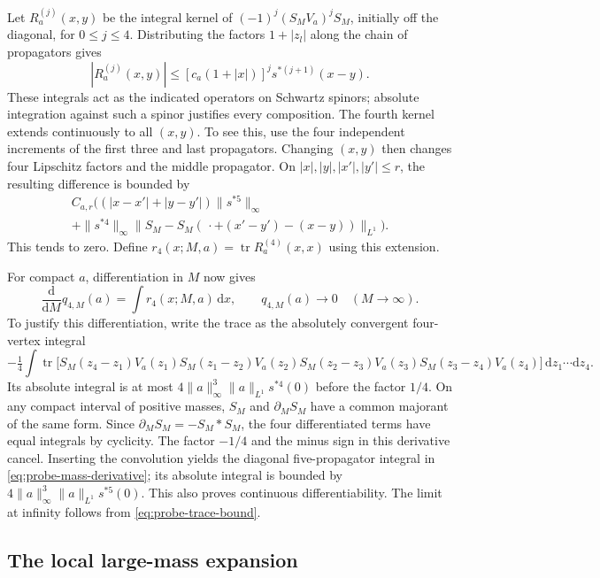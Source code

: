 \documentclass[11pt,letterpaper,reqno]{amsart}
\newcommand{\dd}{\mathrm d}
\DeclareMathOperator{\tr}{tr}
\begin{document}
Let $R_a^{(j)}(x,y)$ be the integral kernel of
$(-1)^j(S_MV_a)^jS_M$, initially off the diagonal, for $0\le j\le4$.
Distributing the factors $1+|z_l|$ along the chain of propagators gives
\begin{equation}\label{eq:probe-kernel-majorant}
 |R_a^{(j)}(x,y)|\le[c_a(1+|x|)]^j s^{*(j+1)}(x-y).
\end{equation}
These integrals act as the indicated operators on Schwartz spinors;
absolute integration against such a spinor justifies every composition.
The fourth kernel extends continuously to all $(x,y)$. To see this,
use the four independent increments of the first three and last
propagators. Changing $(x,y)$ then changes four Lipschitz factors and
the middle propagator. On $|x|,|y|,|x'|,|y'|\le r$, the resulting
difference is bounded by
\begin{multline}\label{eq:probe-kernel-continuity}
 C_{a,r}\bigl((|x-x'|+|y-y'|)\|s^{*5}\|_\infty\\
 +\|s^{*4}\|_\infty
       \|S_M-S_M(\,\cdot+(x'-y')-(x-y))\|_{L^1}\bigr).
\end{multline}
This tends to zero. Define
$r_4(x;M,a)=\tr R_a^{(4)}(x,x)$ using this extension.

For compact $a$, differentiation in $M$ now gives
\begin{equation}\label{eq:probe-mass-derivative}
 \frac{\dd}{\dd M}q_{4,M}(a)=\int r_4(x;M,a)\,\dd x,
 \qquad q_{4,M}(a)\longrightarrow0\quad(M\longrightarrow\infty).
\end{equation}
To justify this differentiation, write the trace as the absolutely convergent
four-vertex integral
\[
 -\tfrac14\int\tr\bigl[S_M(z_4-z_1)V_a(z_1)
 S_M(z_1-z_2)V_a(z_2)S_M(z_2-z_3)V_a(z_3)
 S_M(z_3-z_4)V_a(z_4)\bigr]\,\dd z_1\cdots\dd z_4.
\]
Its absolute integral is at most
$4\|a\|_\infty^3\|a\|_{L^1}s^{*4}(0)$ before the factor $1/4$.
On any compact interval of positive masses, $S_M$ and
$\partial_MS_M$ have a common majorant of the same form. Since
$\partial_MS_M=-S_M*S_M$, the four differentiated terms have equal
integrals by cyclicity. The factor $-1/4$ and the minus sign in this
derivative cancel. Inserting the convolution yields the diagonal
five-propagator integral in \eqref{eq:probe-mass-derivative}; its absolute
integral is bounded by $4\|a\|_\infty^3\|a\|_{L^1}s^{*5}(0)$.
This also proves continuous differentiability. The limit at infinity
follows from \eqref{eq:probe-trace-bound}.

\subsection{The local large-mass expansion}
\end{document}
